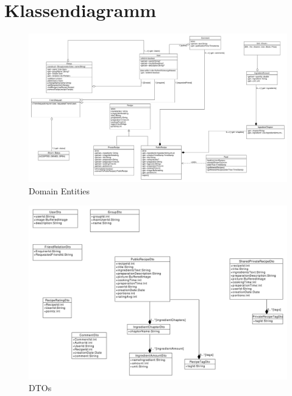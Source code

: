 \chapter{Klassendiagramm}

\begin{figure}
	\centering
	\includegraphics[width=1.0\textwidth]{pics/Domain_Entities_ueberarbeitet}%
	\caption{Domain Entities}%
	\label{domainentities}%
\end{figure}

\begin{figure}
	\centering
	\includegraphics[width=1.0\textwidth]{generatedpics/DTO}%
	\caption{DTOs}%
	\label{dtos}
\end{figure}